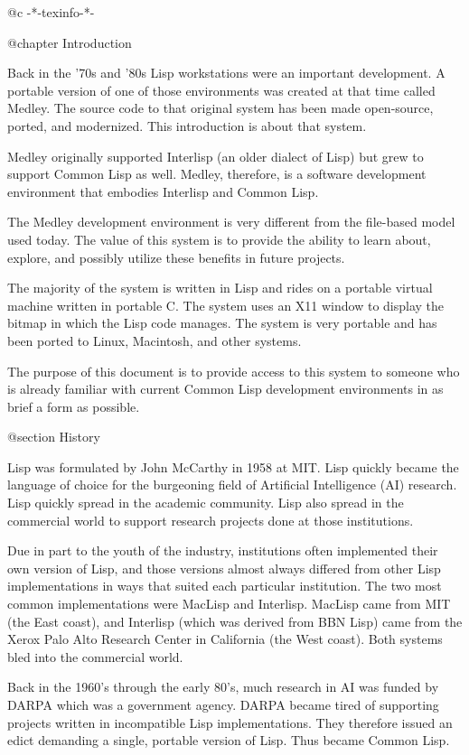 @c -*-texinfo-*-

@chapter Introduction

Back in the '70s and '80s Lisp workstations were an important development.  A
portable version of one of those environments was created at that time called
Medley.  The source code to that original system has been made
open-source, ported, and modernized.  This introduction is about that
system.

Medley originally supported Interlisp (an older dialect of Lisp) but
grew to support Common Lisp as well.  Medley, therefore, is a software
development environment that embodies Interlisp and Common Lisp.

The Medley development environment is very different from the file-based
model used today.  The value of this system is to provide the ability
to learn about, explore, and possibly utilize these benefits in future
projects.

The majority of the system is written in Lisp and rides on a portable
virtual machine written in portable C.  The system uses an X11 window
to display the bitmap in which the Lisp code manages. The system is
very portable and has been ported to Linux, Macintosh, and other
systems.

The purpose of this document is to provide access to this system to
someone who is already familiar with current Common Lisp development
environments in as brief a form as possible.

@section History

Lisp was formulated by John McCarthy in 1958 at MIT.  Lisp quickly
became the language of choice for the burgeoning field of Artificial
Intelligence (AI) research.  Lisp quickly spread in the academic
community.  Lisp also spread in the commercial world to support
research projects done at those institutions.

Due in part to the youth of the industry, institutions often
implemented their own version of Lisp, and those versions almost
always differed from other Lisp implementations in ways that suited
each particular institution.  The two most common implementations were
MacLisp and Interlisp.  MacLisp came from MIT (the East coast), and
Interlisp (which was derived from BBN Lisp) came from the Xerox Palo
Alto Research Center in California (the West coast).  Both systems
bled into the commercial world.

Back in the 1960's through the early 80's, much research in AI was
funded by DARPA which was a government agency.  DARPA became tired of
supporting projects written in incompatible Lisp implementations.
They therefore issued an edict demanding a single, portable version of
Lisp.  Thus became Common Lisp.

